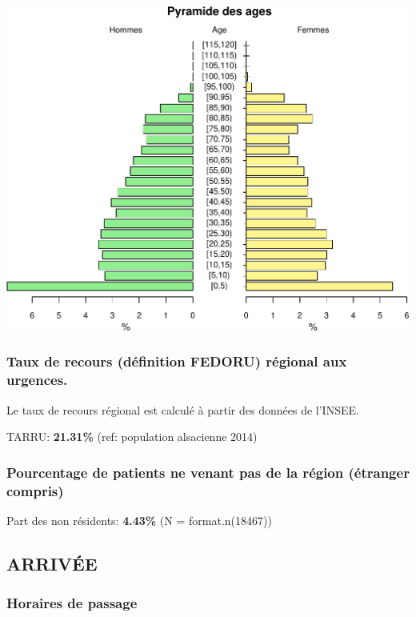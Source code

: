 \documentclass[]{article}
\begin{document}
\includegraphics{rapport2014_V4_files/figure-latex/pyramide-1.pdf}

\subsubsection{Taux de recours (définition FEDORU) régional aux
urgences.}\label{taux-de-recours-definition-fedoru-regional-aux-urgences.}

Le taux de recours régional est calculé à partir des données de l'INSEE.

TARRU: \textbf{21.31\%} (ref: population alsacienne 2014)

\subsubsection{Pourcentage de patients ne venant pas de la région
(étranger
compris)}\label{pourcentage-de-patients-ne-venant-pas-de-la-region-etranger-compris}

Part des non résidents: \textbf{4.43\%} (N = format.n(18467))

\subsection{ARRIVÉE}\label{arrivee}

\subsubsection{Horaires de passage}\label{horaires-de-passage}
\end{document}

